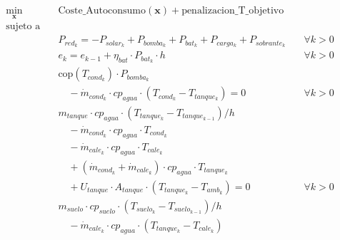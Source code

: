 \begin{align}
	\min_{\mathbf{x}} \quad & \text{Coste\_Autoconsumo}(\mathbf{x}) + \text{penalizacion\_T\_objetivo} \label{eq:regulated_sizing_optimization}                 \\
	\text{sujeto a} \quad   & \nonumber                                                                                                                         \\
	                        & P_{red_k} = -P_{solar_k} + P_{bomba_k} + P_{bat_k} + P_{carga_k} + P_{sobrante_k} \quad                           & \forall k > 0 \\
	                        & e_k = e_{k-1} + \eta_{bat} \cdot P_{bat_k} \cdot h \quad                                                          & \forall k > 0 \\
	                        & \text{cop}(T_{cond_k}) \cdot P_{bomba_k} \nonumber                                                                                \\
	                        & \quad - \dot{m}_{cond_k} \cdot cp_{agua} \cdot (T_{cond_k} - T_{tanque_k}) = 0                                    & \forall k > 0 \\
	                        & m_{tanque} \cdot cp_{agua} \cdot ( T_{tanque_k} - T_{tanque_{k-1}}) / h  \nonumber                                                \\
	                        & \quad - \dot{m}_{cond_k} \cdot cp_{agua} \cdot T_{cond_k} \nonumber                                                               \\
	                        & \quad - \dot{m}_{cale_k} \cdot cp_{agua} \cdot T_{cale_k} \nonumber                                                               \\
	                        & \quad + (\dot{m}_{cond_k} + \dot{m}_{cale_k}) \cdot cp_{agua} \cdot T_{tanque_k} \nonumber                                        \\
	                        & \quad + U_{tanque} \cdot A_{tanque} \cdot (T_{tanque_k} - T_{amb_k}) = 0  \label{eq:sizing_dae2}                  & \forall k > 0 \\
	                        & m_{suelo} \cdot cp_{suelo} \cdot ( T_{suelo_k} - T_{suelo_{k-1}}) / h \nonumber                                                   \\
	                        & \quad - \dot{m}_{cale_k} \cdot cp_{agua} \cdot (T_{tanque_k} - T_{cale_k})                             \nonumber                  \\

\end{align}
